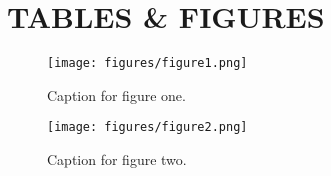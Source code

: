 \section{TABLES \& FIGURES}	%

\setcounter{table}{0}		%
\setcounter{figure}{0}		%


\begin{figure}[H]			%
	\centering
	\texttt{[image: figures/figure1.png]}
    \caption{Caption for figure one.}
    \label{fig:figure1}
\end{figure}

\begin{figure}[H]			%
	\centering
	\texttt{[image: figures/figure2.png]}
    \caption{Caption for figure two.}
    \label{fig:figure2}
\end{figure}


\clearpage